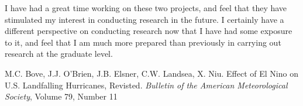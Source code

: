 \documentclass[a4paper,12pt]{article}
\begin{document}
I have had a great time working on these two projects, and feel that they have stimulated my interest in conducting research in the future.  I certainly have a different perspective on conducting research now that I have had some exposure to it, and feel that I am much more prepared than previously in carrying out research at the graduate level.  
\begin{thebibliography}{9} \vspace{-1ex}
\footnotesize
M.C. Bove, J.J. O'Brien, J.B. Elsner, C.W. Landsea, X. Niu.  Effect of El Nino on U.S. Landfalling Hurricanes, Revisted.  \textit{Bulletin of the American Meteorological Society}, Volume 79, Number 11
\end{thebibliography}
\end{document}
